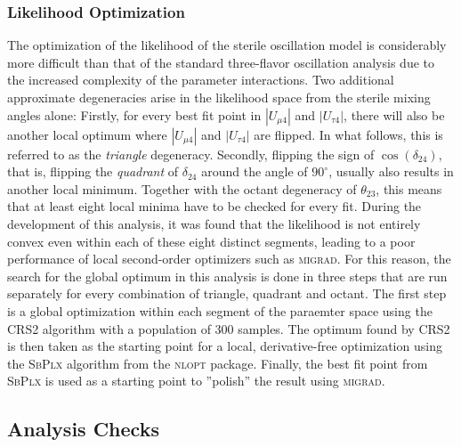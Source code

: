 \subsubsection{Likelihood Optimization}
The optimization of the likelihood of the sterile oscillation model is considerably more difficult than that of the standard three-flavor oscillation analysis due to the increased complexity of the parameter interactions. Two additional approximate degeneracies arise in the likelihood space from the sterile mixing angles alone: Firstly, for every best fit point in $|U_{\mu 4}|$ and $|U_{\tau 4}|$, there will also be another local optimum where $|U_{\mu 4}|$ and $|U_{\tau 4}|$ are flipped. In what follows, this is referred to as the \emph{triangle} degeneracy. Secondly, flipping the sign of $\cos(\delta_{24})$, that is, flipping the \emph{quadrant} of $\delta_{24}$ around the angle of $90^\circ$, usually also results in another local minimum. Together with the octant degeneracy of $\theta_{23}$, this means that at least eight local minima have to be checked for every fit. During the development of this analysis, it was found that the likelihood is not entirely convex even within each of these eight distinct segments, leading to a poor performance of local second-order optimizers such as \textsc{migrad}\cite{minuit-algo}. For this reason, the search for the global optimum in this analysis is done in three steps that are run separately for every combination of triangle, quadrant and octant. The first step is a global optimization within each segment of the paraemter space using the CRS2\cite{crs2} algorithm with a population of 300 samples. The optimum found by CRS2 is then taken as the starting point for a local, derivative-free optimization using the \textsc{SbPlx}\cite{subplex} algorithm from the \textsc{nlopt}\cite{nlopt} package. Finally, the best fit point from  \textsc{SbPlx} is used as a starting point to ''polish'' the result using \textsc{migrad}\cite{minuit-algo}. 

\subsection{Analysis Checks}

